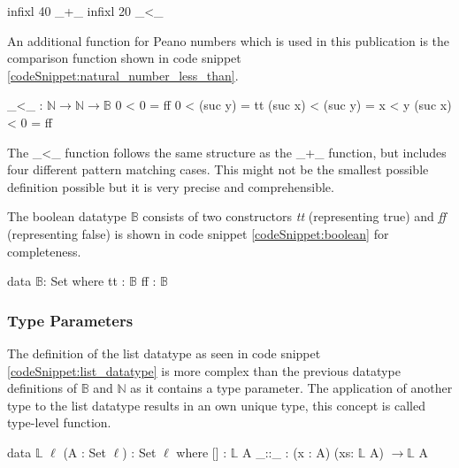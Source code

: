 \begin{codesnippet}[mathescape=true, caption={Precedence and associativity of some Peano number operators}, label={codeSnippet:natural_number_precedence}]
infixl 40 _+_
infixl 20 _<_
\end{codesnippet}

An additional function for Peano numbers which is used in this publication is the comparison function shown in code snippet \ref{codeSnippet:natural_number_less_than}.

\begin{codesnippet}[mathescape=true, caption={Peano numbers less-than}, label={codeSnippet:natural_number_less_than}]
_<_ : $\mathbb{N} \rightarrow \mathbb{N} \rightarrow \mathbb{B}$
0 < 0 = ff
0 < (suc y) = tt
(suc x) < (suc y) = x < y
(suc x) < 0 = ff
\end{codesnippet}

The \_\textless\_ function follows the same structure as the \_+\_ function, but includes four different pattern matching cases. 
This might not be the smallest possible definition possible but it is very precise and comprehensible.

The boolean datatype $\mathbb{B}$ consists of two constructors \emph{tt} (representing true) and \emph{ff} (representing false) is shown in code snippet \ref{codeSnippet:boolean} for completeness.

\begin{codesnippet}[mathescape=true, caption={Definition of the boolean datatype in Agda}, label={codeSnippet:boolean}]
data $\mathbb{B}$: Set where
  tt : $\mathbb{B}$
  ff  : $\mathbb{B}$
\end{codesnippet}

\subsubsection{Type Parameters}
The definition of the list datatype as seen in code snippet \ref{codeSnippet:list_datatype} is more complex than the previous datatype definitions of $\mathbb{B}$ and $\mathbb{N}$ as it contains a type parameter.
The application of another type to the list datatype results in an own unique type, this concept is called type-level function.


\begin{codesnippet}[mathescape=true, caption={Definition of the list datatype in Agda}, label={codeSnippet:list_datatype}]
data $\mathbb{L}$ {$\ell$} (A : Set $\ell$) : Set $\ell$ where
  [] : $\mathbb{L}$ A
  _::_ : (x : A) (xs: $\mathbb{L}$ A) $\rightarrow \mathbb{L}$ A
\end{codesnippet}

